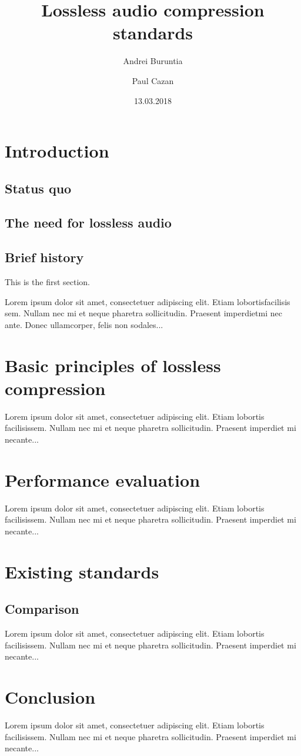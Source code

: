 \documentclass{article}
\title{Lossless audio compression standards}
\author{Andrei Buruntia\\
	\and
	Paul Cazan}
\date{13.03.2018 }
\begin{document}
 
\maketitle
 
\tableofcontents
 
\section{Introduction}
\subsection{Status quo}
\subsection{The need for lossless audio}
\subsection{Brief history}
 
This is the first section.
 
Lorem  ipsum  dolor  sit  amet,  consectetuer  adipiscing  
elit.   Etiam  lobortisfacilisis sem.  Nullam nec mi et 
neque pharetra sollicitudin.  Praesent imperdietmi nec ante. 
Donec ullamcorper, felis non sodales...
 
\section{ Basic principles of lossless compression}

Lorem ipsum dolor sit amet, consectetuer adipiscing elit.  
Etiam lobortis facilisissem.  Nullam nec mi et neque pharetra 
sollicitudin.  Praesent imperdiet mi necante...


\section{Performance evaluation}
 
Lorem ipsum dolor sit amet, consectetuer adipiscing elit.  
Etiam lobortis facilisissem.  Nullam nec mi et neque pharetra 
sollicitudin.  Praesent imperdiet mi necante...
 
\section{Existing standards}
 \subsection{Comparison}
Lorem ipsum dolor sit amet, consectetuer adipiscing elit.  
Etiam lobortis facilisissem.  Nullam nec mi et neque pharetra 
sollicitudin.  Praesent imperdiet mi necante...

 \section{Conclusion}
 
Lorem ipsum dolor sit amet, consectetuer adipiscing elit.  
Etiam lobortis facilisissem.  Nullam nec mi et neque pharetra 
sollicitudin.  Praesent imperdiet mi necante...
 
\end{document}
